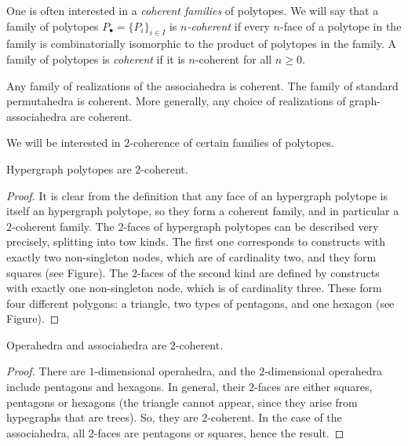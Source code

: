 One is often interested in a \emph{coherent families} of polytopes. 
We will say that a family of polytopes $P_\bullet = \{P_i\}_{i \in I}$ is \emph{$n$-coherent} if every $n$-face of a polytope in the family is combinatorially isomorphic to the product of polytopes in the family. 
A family of polytopes is \emph{coherent} if it is $n$-coherent for all $n \geq 0$.

\begin{example}
    Any family of realizations of the associahedra is coherent. 
    The family of standard permutahedra is coherent. 
    More generally, any choice of realizations of graph-associahedra are coherent. 
\end{example}

We will be interested in $2$-coherence of certain families of polytopes. 

\begin{proposition}
    Hypergraph polytopes are $2$-coherent. 
\end{proposition}

\begin{proof}
    It is clear from the definition that any face of an hypergraph polytope is itself an hypergraph polytope, so they form a coherent family, and in particular a $2$-coherent family. 
    The $2$-faces of hypergraph polytopes can be described very precisely, splitting into tow kinds. 
    The first one corresponds to constructs with exactly two non-singleton nodes, which are of cardinality two, and they form squares (see Figure).
    The $2$-faces of the second kind are defined by constructs with exactly one non-singleton node, which is of cardinality three. 
    These form four different polygons: a triangle, two types of pentagons, and one hexagon (see Figure). 
\end{proof}

\begin{corollary}
    \label{c:operahedra-2-coh}
    Operahedra and associahedra are $2$-coherent.
\end{corollary}

\begin{proof}
    There are $1$-dimensional operahedra, and the $2$-dimensional operahedra include pentagons and hexagons. 
    In general, their $2$-faces are either squares, pentagons or hexagons (the triangle cannot appear, since they arise from hypegraphs that are trees).
    So, they are $2$-coherent. 
    In the case of the associahedra, all $2$-faces are pentagons or squares, hence the result. 
\end{proof}

